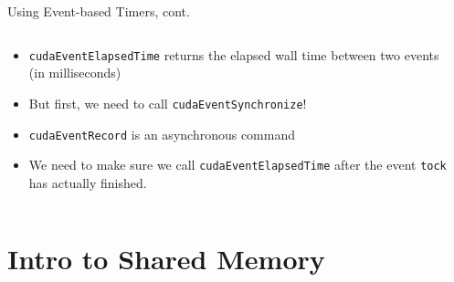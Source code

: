 \documentclass{beamer}
\begin{document}
    \begin{frame}{Using Event-based Timers, cont.}
        \begin{columns}
            \begin{column}{0.4\textwidth}
            {\footnotesize
            \begin{itemize}
                \item \texttt{cudaEventElapsedTime} returns the elapsed wall time between two events (in milliseconds)
                \item But first, we need to call \texttt{cudaEventSynchronize}!
                \item \texttt{cudaEventRecord} is an asynchronous command
                \item We need to make sure we call \texttt{cudaEventElapsedTime} after the event \texttt{tock} has actually finished.
            \end{itemize}
            }
            \end{column}
            \begin{column}{0.6\textwidth}
                \begin{block}{}
                    \inputminted{cuda}{src/gpu-timer.cu}
                \end{block}
            \end{column}
        \end{columns}
    \end{frame}

    \section{Intro to Shared Memory}
\end{document}

